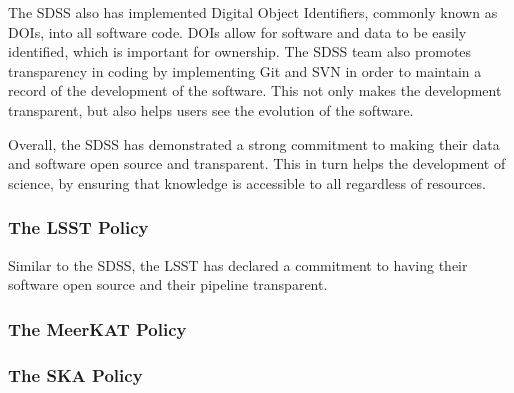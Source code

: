 \documentclass[preprint,linenumbers, longauthor]{aastex631}
\begin{document}
The SDSS also has implemented Digital Object Identifiers, commonly known as DOIs, into all software code. DOIs allow for software and data to be easily identified, which is important for ownership.
The SDSS team also promotes transparency in coding by implementing Git and SVN in order to maintain a record of the development of the software. This not only makes the development transparent, but also helps users see the evolution of the software.

Overall, the SDSS has demonstrated a strong commitment to making their data and software open source and transparent. This in turn helps the development of science, by ensuring that knowledge is accessible to all regardless of resources. 

\subsubsection{The LSST Policy}
Similar to the SDSS, the LSST has declared a commitment to having their software open source and their pipeline transparent.

\subsubsection{The MeerKAT Policy}


\subsubsection{The SKA Policy}



\end{document}
